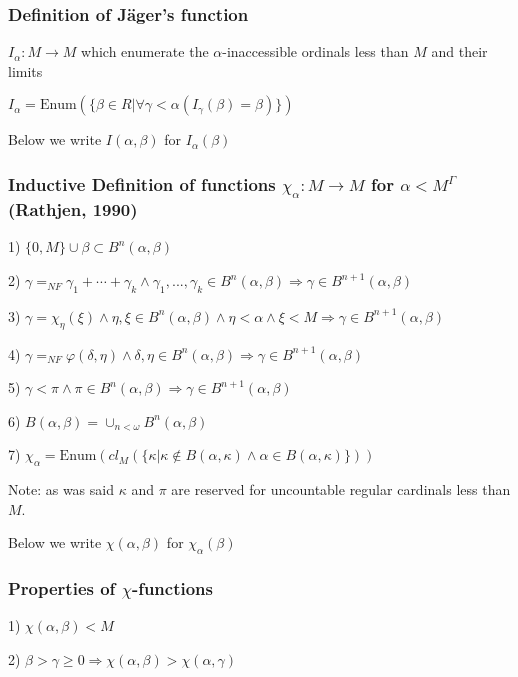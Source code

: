 \documentclass[10pt]{article}
\begin{document}
\subsubsection{Definition of Jäger's function}

 \(I_\alpha:M\rightarrow M\) which enumerate the \(\alpha\)-inaccessible ordinals less than \(M\) and their limits

\(I_\alpha=\text{Enum}(\{\beta\in R|\forall\gamma<\alpha(I_\gamma(\beta)=\beta)\}) \)

Below we write \(I(\alpha,\beta)\) for \(I_\alpha(\beta)\)

\subsubsection{Inductive Definition of  functions \(\chi_\alpha: M\rightarrow M\) for \(\alpha <M^{\Gamma}\) (Rathjen, 1990)}

1) \(\{0,M\}\cup\beta\subset B^n(\alpha, \beta)\)

2) \(\gamma=_{NF}\gamma_1+\cdots+\gamma_k\wedge\gamma_1,...,\gamma_k\in B^n(\alpha, \beta)\Rightarrow\gamma\in B^{n+1}(\alpha, \beta)\)

3) \(\gamma=\chi_\eta(\xi)\wedge\eta,\xi\in B^n(\alpha, \beta)\wedge\eta<\alpha\wedge\xi<M\Rightarrow\gamma\in B^{n+1}(\alpha, \beta)\)

4) \(\gamma=_{NF}\varphi(\delta,\eta) \wedge\delta,\eta\in B^n(\alpha, \beta)\Rightarrow\gamma\in B^{n+1}(\alpha, \beta)\)

5) \(\gamma<\pi\wedge\pi\in B^n(\alpha, \beta)\Rightarrow\gamma\in B^{n+1}(\alpha, \beta)\)

6) \(B(\alpha,\beta)=\cup_{n<\omega}B^{n}(\alpha, \beta)\)

7) \(\chi_\alpha=\text{Enum}(cl_M(\{\kappa|\kappa\notin B(\alpha,\kappa)\wedge\alpha\in B(\alpha,\kappa)\}))\)

Note: as was said \(\kappa\) and \(\pi \) are reserved for uncountable regular cardinals less than \(M\). 

Below we write \(\chi(\alpha,\beta)\) for \(\chi_\alpha(\beta)\)

\subsubsection{Properties of  \(\chi\)-functions}

1) \(\chi(\alpha,\beta)<M\)

2) \(\beta>\gamma\geq 0 \Rightarrow \chi(\alpha,\beta)>\chi(\alpha,\gamma)\) 
\end{document}
